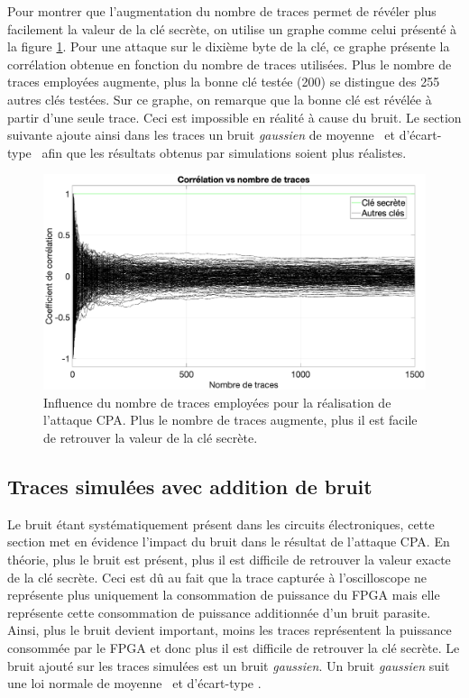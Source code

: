 \documentclass[oneside]{book}
\begin{document}
Pour montrer que l’augmentation du nombre de traces permet de révéler plus facilement la valeur de la clé secrète, on utilise un graphe comme celui présenté à la figure \ref{fig:sim_corr_fonction_nb_traces}. Pour une attaque sur le dixième byte de la clé, ce graphe présente la corrélation obtenue en fonction du nombre de traces utilisées. Plus le nombre de traces employées augmente, plus la bonne clé testée (200) se distingue des 255 autres clés testées. Sur ce graphe, on remarque que la bonne clé est révélée à partir d'une seule trace. Ceci est impossible en réalité à cause du bruit. Le section suivante ajoute ainsi dans les traces un bruit \textit{gaussien} de moyenne \mu \ et d'écart-type \sigma \ afin que les résultats obtenus par simulations soient plus réalistes.

\begin{figure}[htbp]
    \hspace{-2.5cm}
    \includegraphics[scale=0.41]{image/sim_corr_fonction_nb_traces}
    \caption{Influence du nombre de traces employées pour la réalisation de l'attaque CPA. Plus le nombre de traces augmente, plus il est facile de retrouver la valeur de la clé secrète.}
    \label{fig:sim_corr_fonction_nb_traces} 
\end{figure}

\subsection{Traces simulées avec addition de bruit}
\label{sec:sim_trace_noise}

Le bruit étant systématiquement présent dans les circuits électroniques, cette section met en évidence l'impact du bruit dans le résultat de l'attaque CPA. En théorie, plus le bruit est présent, plus il est difficile de retrouver la valeur exacte de la clé secrète. Ceci est dû au fait que la trace capturée à l'oscilloscope ne représente plus uniquement la consommation de puissance du FPGA mais elle représente cette consommation de puissance additionnée d'un bruit parasite. Ainsi, plus le bruit devient important, moins les traces représentent la puissance consommée par le FPGA et donc plus il est difficile de retrouver la clé secrète. Le bruit ajouté sur les traces simulées est un bruit \textit{gaussien}. Un bruit \textit{gaussien} suit une loi normale de moyenne \mu \ et d'écart-type \sigma.
\end{document}
